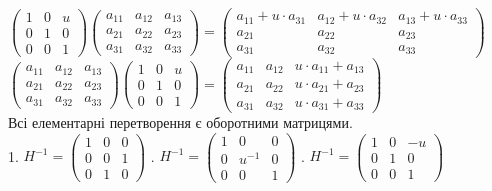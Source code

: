 \documentclass{math_library}
\begin{document}
$\begin{pmatrix}
1 & 0 & u \\
0 & 1 & 0 \\
0 & 0 & 1
\end{pmatrix} \begin{pmatrix}
a_{11} & a_{12} & a_{13} \\
a_{21} & a_{22} & a_{23} \\
a_{31} & a_{32} & a_{33} 
\end{pmatrix} = \begin{pmatrix}
a_{11} + u \cdot a_{31} & a_{12} + u \cdot a_{32} & a_{13} + u \cdot a_{33} \\
a_{21} & a_{22} & a_{23} \\
a_{31} & a_{32} & a_{33} 
\end{pmatrix}$\\
$\begin{pmatrix}
a_{11} & a_{12} & a_{13} \\
a_{21} & a_{22} & a_{23} \\
a_{31} & a_{32} & a_{33} 
\end{pmatrix} \begin{pmatrix}
1 & 0 & u \\
0 & 1 & 0 \\
0 & 0 & 1
\end{pmatrix} = \begin{pmatrix}
a_{11} & a_{12} & u \cdot a_{11} + a_{13} \\
a_{21} & a_{22} & u \cdot a_{21} + a_{23} \\
a_{31} & a_{32} & u \cdot a_{31} + a_{33}
\end{pmatrix}$
\bigskip \\
Всі елементарні перетворення є оборотними матрицями.\\
1. $H^{-1} = \begin{pmatrix}
1 & 0 & 0 \\
0 & 0 & 1 \\
0 & 1 & 0
\end{pmatrix}$ . $H^{-1} = \begin{pmatrix}
1 & 0 & 0 \\
0 & u^{-1} & 0 \\
0 & 0 & 1
\end{pmatrix}$ . $H^{-1} = \begin{pmatrix}
1 & 0 & -u \\
0 & 1 & 0 \\
0 & 0 & 1
\end{pmatrix}$
\end{document}
